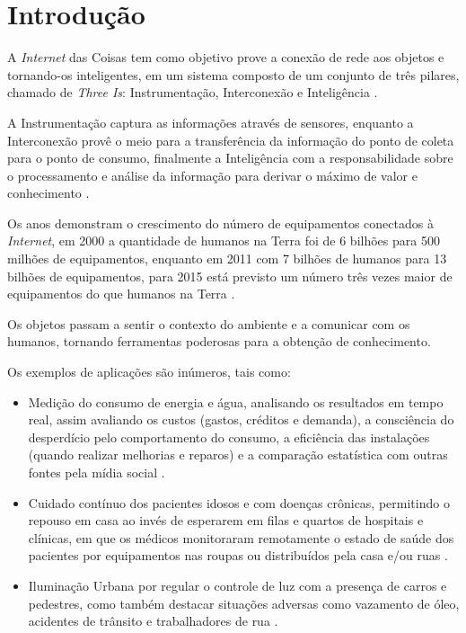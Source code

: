 %

\chapter{Introdução}

A \textit{Internet} das Coisas tem como objetivo prove a conexão de rede aos
objetos e tornando-os inteligentes, em um sistema composto de um conjunto de
três pilares, chamado de \textit{Three Is}: Instrumentação, Interconexão e
Inteligência \cite{mqttibm2012}.

A Instrumentação captura as informações através de sensores, enquanto a
Interconexão provê o meio para a transferência da informação do ponto de coleta
para o ponto de consumo, finalmente a Inteligência com a responsabilidade sobre
o processamento e análise da informação para derivar o máximo de valor e
conhecimento \cite{mqttibm2012}.

Os anos demonstram o crescimento do número de equipamentos conectados à
\textit{Internet}, em 2000 a quantidade de humanos na Terra foi de 6 bilhões
para 500 milhões de equipamentos, enquanto em 2011 com 7 bilhões de humanos
para 13 bilhões de equipamentos, para 2015 está previsto um número três vezes
maior de equipamentos do que humanos na Terra \cite{mirkopresser2012}.

Os objetos passam a sentir o contexto do ambiente e a comunicar com os humanos,
tornando ferramentas poderosas para a obtenção de conhecimento.

Os exemplos de aplicações são inúmeros, tais como:

\begin{itemize}

    \item Medição do consumo de energia e água, analisando os resultados em
      tempo real, assim avaliando os custos (gastos, créditos e demanda), a
      consciência do desperdício pelo comportamento do consumo, a eficiência
      das instalações (quando realizar melhorias e reparos) e a comparação
      estatística com outras fontes pela mídia social \cite{mirkopresser2012}.

    \item Cuidado contínuo dos pacientes idosos e com doenças crônicas,
      permitindo o repouso em casa ao invés de esperarem em filas e quartos de
      hospitais e clínicas, em que os médicos monitoraram remotamente o estado
      de saúde dos pacientes por equipamentos nas roupas ou distribuídos pela
      casa e/ou ruas \cite{mirkopresser2012}.

    \item Iluminação Urbana por regular o controle de luz com a presença de
      carros e pedestres, como também destacar situações adversas como
      vazamento de óleo, acidentes de trânsito e trabalhadores de rua
      \cite{mirkopresser2012}.

\end{itemize}

